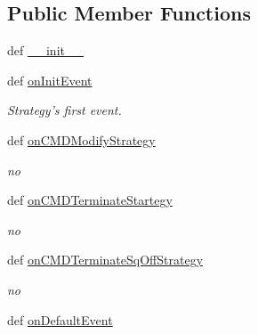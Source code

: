 \subsection*{Public Member Functions}
\begin{DoxyCompactItemize}
\item 
def \hyperlink{classmuTradePyBase_1_1CustomStrategy_a92a6a08fb0bd5376f336bf60dbbe6152}{\-\_\-\-\_\-init\-\_\-\-\_\-}
\item 
\hypertarget{classmuTradePyBase_1_1CustomStrategy_ae8d3fbc2da91a1fcd1172e75580eeffc}{def \hyperlink{classmuTradePyBase_1_1CustomStrategy_ae8d3fbc2da91a1fcd1172e75580eeffc}{on\-Init\-Event}}\label{classmuTradePyBase_1_1CustomStrategy_ae8d3fbc2da91a1fcd1172e75580eeffc}

\begin{DoxyCompactList}\small\item\em Strategy's first event. \end{DoxyCompactList}\item 
\hypertarget{classmuTradePyBase_1_1CustomStrategy_a4c4f4e22098ac9dfaeacb5e2be97290f}{def \hyperlink{classmuTradePyBase_1_1CustomStrategy_a4c4f4e22098ac9dfaeacb5e2be97290f}{on\-C\-M\-D\-Modify\-Strategy}}\label{classmuTradePyBase_1_1CustomStrategy_a4c4f4e22098ac9dfaeacb5e2be97290f}

\begin{DoxyCompactList}\small\item\em no \end{DoxyCompactList}\item 
\hypertarget{classmuTradePyBase_1_1CustomStrategy_a9e83319de48ed28eb700dc11e961987c}{def \hyperlink{classmuTradePyBase_1_1CustomStrategy_a9e83319de48ed28eb700dc11e961987c}{on\-C\-M\-D\-Terminate\-Startegy}}\label{classmuTradePyBase_1_1CustomStrategy_a9e83319de48ed28eb700dc11e961987c}

\begin{DoxyCompactList}\small\item\em no \end{DoxyCompactList}\item 
\hypertarget{classmuTradePyBase_1_1CustomStrategy_a80d426e07d82138f4a4efd8374c3db17}{def \hyperlink{classmuTradePyBase_1_1CustomStrategy_a80d426e07d82138f4a4efd8374c3db17}{on\-C\-M\-D\-Terminate\-Sq\-Off\-Strategy}}\label{classmuTradePyBase_1_1CustomStrategy_a80d426e07d82138f4a4efd8374c3db17}

\begin{DoxyCompactList}\small\item\em no \end{DoxyCompactList}\item 
\hypertarget{classmuTradePyBase_1_1CustomStrategy_a72511bc733be7533bdc39296ed25adab}{def \hyperlink{classmuTradePyBase_1_1CustomStrategy_a72511bc733be7533bdc39296ed25adab}{on\-Default\-Event}}\label{classmuTradePyBase_1_1CustomStrategy_a72511bc733be7533bdc39296ed25adab}


\end{DoxyCompactItemize}
